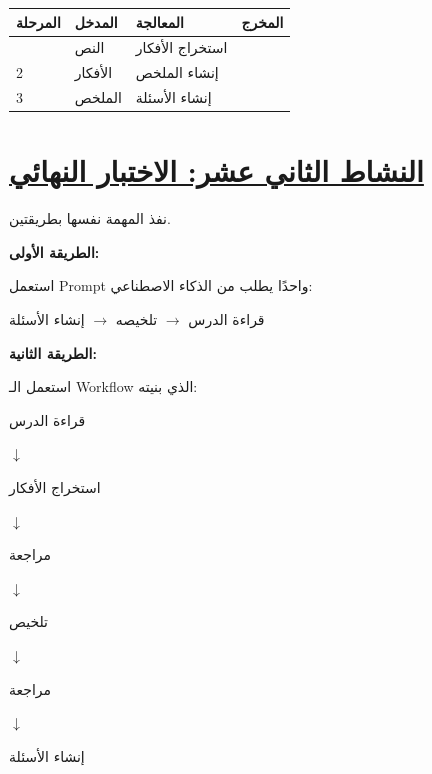 \documentclass[a4paper]{article}
\begin{document}
\begin{center}

\begin{tabular}{|
>{\centering\arraybackslash}m{1.5cm}|
>{\raggedleft\arraybackslash}m{4cm}|
>{\raggedleft\arraybackslash}m{4cm}|
>{\raggedleft\arraybackslash}m{4cm}|}

\hline

\textbf{المرحلة}
&
\textbf{المدخل}
&
\textbf{المعالجة}
&
\textbf{المخرج}
\\

\hline

1
&
النص
&
استخراج الأفكار
&
\\[1cm]

\hline

2
&
الأفكار
&
إنشاء الملخص
&
\\[1cm]

\hline

3
&
الملخص
&
إنشاء الأسئلة
&
\\[1cm]

\hline

\end{tabular}

\end{center}



\section*{\khatt\underline{النشاط الثاني عشر: الاختبار النهائي}}

نفذ المهمة نفسها بطريقتين.

\textbf{الطريقة الأولى:}

استعمل Prompt واحدًا يطلب من الذكاء الاصطناعي:

\begin{center}

قراءة الدرس $\rightarrow$ تلخيصه $\rightarrow$
إنشاء الأسئلة

\end{center}

\textbf{الطريقة الثانية:}

استعمل الـ Workflow الذي بنيته:

\begin{center}

قراءة الدرس

$\downarrow$

استخراج الأفكار

$\downarrow$

مراجعة

$\downarrow$

تلخيص

$\downarrow$

مراجعة

$\downarrow$

إنشاء الأسئلة

\end{center}
\end{document}
